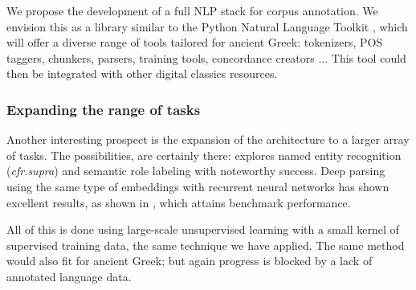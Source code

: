 We propose the development of a full NLP stack for corpus
annotation. We envision this as a library similar to the Python
Natural Language Toolkit \citep{nltkhome}, which will offer a diverse
range of tools tailored for ancient Greek: tokenizers, POS taggers,
chunkers, parsers, training tools, concordance creators ... This tool
could then be integrated with other digital classics resources.

\subsubsection{Expanding the range of tasks}
\label{sec:expand}
Another interesting prospect is the expansion of the architecture to a
larger array of tasks. The possibilities, are certainly there:
\cite{collobert-2011} explores named entity recognition
(\textit{cfr.supra}) and semantic role labeling with noteworthy
success. Deep parsing using the same type of embeddings with recurrent
neural networks has shown excellent results, as shown in
\cite{collobert2011deep}, which attains benchmark performance. 

All of this is done using large-scale unsupervised learning with a
small kernel of supervised training data, the same technique we have
applied. The same method would also fit for ancient Greek; but again
progress is blocked by a lack of annotated language data. 



